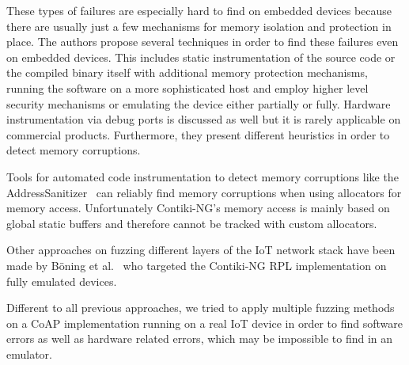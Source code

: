 These types of failures are especially hard to find on embedded devices because there are usually just a few mechanisms for memory isolation and protection in place. The authors propose several techniques in order to find these failures even on embedded devices. This includes static instrumentation of the source code or the compiled binary itself with additional memory protection mechanisms, running the software on a more sophisticated host and employ higher level security mechanisms or emulating the device either partially or fully. Hardware instrumentation via debug ports is discussed as well but it is rarely applicable on commercial products. Furthermore, they present different heuristics in order to detect memory corruptions.

Tools for automated code instrumentation to detect memory corruptions like the AddressSanitizer~\cite{addressSanitizer} can reliably find memory corruptions when using allocators for memory access. Unfortunately Contiki-NG's memory access is mainly based on global static buffers and therefore cannot be tracked with custom allocators.

Other approaches on fuzzing different layers of the IoT network stack have been made by Böning et al.~\cite{PawelLeo} who targeted the Contiki-NG RPL implementation on fully emulated devices.

Different to all previous approaches, we tried to apply multiple fuzzing methods on a CoAP implementation running on a real IoT device in order to find software errors as well as hardware related errors, which may be impossible to find in an emulator.
